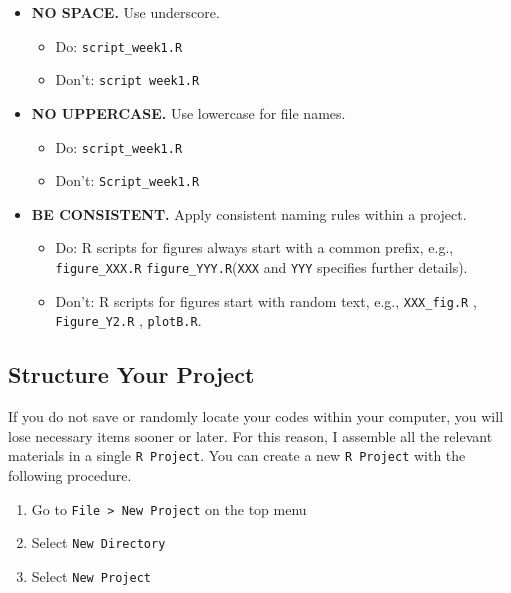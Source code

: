 \documentclass[
]{book}
\providecommand{\tightlist}{%
  \setlength{\itemsep}{0pt}\setlength{\parskip}{0pt}}
\begin{document}
\begin{itemize}
\tightlist
\item
  \textbf{NO SPACE.} Use underscore.

  \begin{itemize}
  \tightlist
  \item
    Do: \texttt{script\_week1.R}
  \item
    Don't: \texttt{script\ week1.R}
  \end{itemize}
\item
  \textbf{NO UPPERCASE.} Use lowercase for file names.

  \begin{itemize}
  \tightlist
  \item
    Do: \texttt{script\_week1.R}
  \item
    Don't: \texttt{Script\_week1.R}
  \end{itemize}
\item
  \textbf{BE CONSISTENT.} Apply consistent naming rules within a project.

  \begin{itemize}
  \tightlist
  \item
    Do: R scripts for figures always start with a common prefix, e.g., \texttt{figure\_XXX.R} \texttt{figure\_YYY.R}(\texttt{XXX} and \texttt{YYY} specifies further details).
  \item
    Don't: R scripts for figures start with random text, e.g., \texttt{XXX\_fig.R} , \texttt{Figure\_Y2.R} , \texttt{plotB.R}.
  \end{itemize}
\end{itemize}

\hypertarget{structure-your-project}{%
\subsection{Structure Your Project}\label{structure-your-project}}

If you do not save or randomly locate your codes within your computer, you will lose necessary items sooner or later. For this reason, I assemble all the relevant materials in a single \texttt{R\ Project}. You can create a new \texttt{R\ Project} with the following procedure.

\begin{enumerate}
\def\labelenumi{\alph{enumi}.}
\tightlist
\item
  Go to \texttt{File\ \textgreater{}\ New\ Project} on the top menu
\item
  Select \texttt{New\ Directory}
\item
  Select \texttt{New\ Project}
\end{enumerate}
\end{document}
